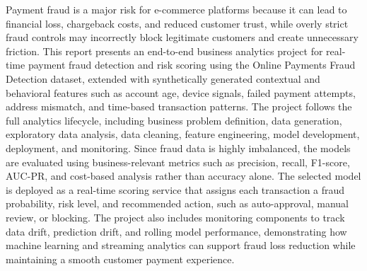 Payment fraud is a major risk for e-commerce platforms because it can lead to financial loss, chargeback costs, and reduced customer trust, while overly strict fraud controls may incorrectly block legitimate customers and create unnecessary friction. This report presents an end-to-end business analytics project for real-time payment fraud detection and risk scoring using the Online Payments Fraud Detection dataset, extended with synthetically generated contextual and behavioral features such as account age, device signals, failed payment attempts, address mismatch, and time-based transaction patterns. The project follows the full analytics lifecycle, including business problem definition, data generation, exploratory data analysis, data cleaning, feature engineering, model development, deployment, and monitoring. Since fraud data is highly imbalanced, the models are evaluated using business-relevant metrics such as precision, recall, F1-score, AUC-PR, and cost-based analysis rather than accuracy alone. The selected model is deployed as a real-time scoring service that assigns each transaction a fraud probability, risk level, and recommended action, such as auto-approval, manual review, or blocking. The project also includes monitoring components to track data drift, prediction drift, and rolling model performance, demonstrating how machine learning and streaming analytics can support fraud loss reduction while maintaining a smooth customer payment experience.
